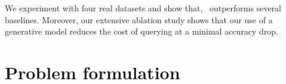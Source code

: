 \documentclass[letterpaper]{article}
\renewcommand{\cite}{\citep}
\begin{document}




We experiment with four real datasets and show that, \our\ outperforms several baselines. Moreover, our extensive ablation study shows that our use of a generative model reduces the cost of querying at a minimal accuracy drop.
%

\section{Problem formulation}
\end{document}

